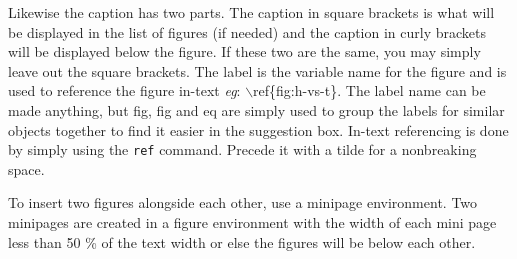 \documentclass[a4paper,12pt]{article}
\begin{document}
Likewise the caption has two parts. The caption in square brackets is what will be displayed in the list of figures (if needed) and the caption in curly brackets will be displayed below the figure. If these two are the same, you may simply leave out the square brackets. The label is the variable name for the figure and is used to reference the figure in-text \textit{eg}: $\backslash$ref\{fig:h-vs-t\}. The label name can be made anything, but \textsf{fig}, \textsf{fig} and \textsf{eq} are simply used to group the labels for similar objects together to find it easier in the suggestion box. In-text referencing is done by simply using the \texttt{ref} command. Precede it with a tilde for a nonbreaking space.



To insert two figures alongside each other, use a minipage environment. Two minipages are created in a figure environment with the width of each mini page less than 50 \% of the text width or else the figures will be below each other.
\end{document}
